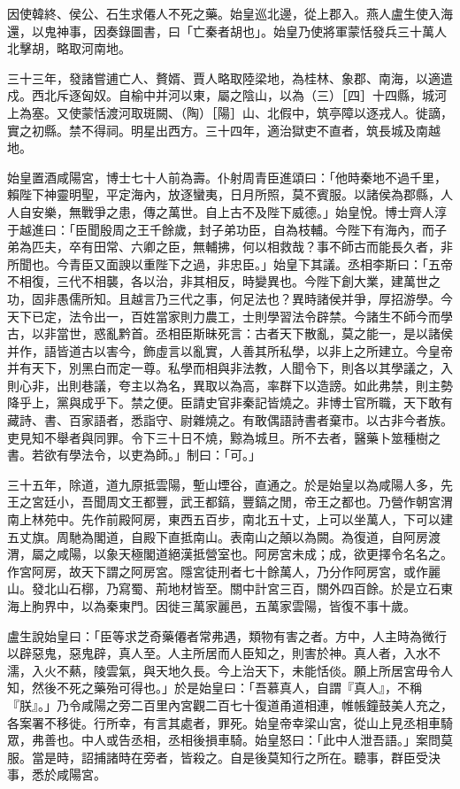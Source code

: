 \begin{pinyinscope}
因使韓終、侯公、石生求僊人不死之藥。始皇巡北邊，從上郡入。燕人盧生使入海還，以鬼神事，因奏錄圖書，曰「亡秦者胡也」。始皇乃使將軍蒙恬發兵三十萬人北擊胡，略取河南地。

三十三年，發諸嘗逋亡人、贅婿、賈人略取陸梁地，為桂林、象郡、南海，以適遣戍。西北斥逐匈奴。自榆中并河以東，屬之陰山，以為（三）［四］十四縣，城河上為塞。又使蒙恬渡河取斑闕、（陶）［陽］山、北假中，筑亭障以逐戎人。徙謫，實之初縣。禁不得祠。明星出西方。三十四年，適治獄吏不直者，筑長城及南越地。

始皇置酒咸陽宮，博士七十人前為壽。仆射周青臣進頌曰：「他時秦地不過千里，賴陛下神靈明聖，平定海內，放逐蠻夷，日月所照，莫不賓服。以諸侯為郡縣，人人自安樂，無戰爭之患，傳之萬世。自上古不及陛下威德。」始皇悅。博士齊人淳于越進曰：「臣聞殷周之王千餘歲，封子弟功臣，自為枝輔。今陛下有海內，而子弟為匹夫，卒有田常、六卿之臣，無輔拂，何以相救哉？事不師古而能長久者，非所聞也。今青臣又面諛以重陛下之過，非忠臣。」始皇下其議。丞相李斯曰：「五帝不相復，三代不相襲，各以治，非其相反，時變異也。今陛下創大業，建萬世之功，固非愚儒所知。且越言乃三代之事，何足法也？異時諸侯并爭，厚招游學。今天下已定，法令出一，百姓當家則力農工，士則學習法令辟禁。今諸生不師今而學古，以非當世，惑亂黔首。丞相臣斯昧死言：古者天下散亂，莫之能一，是以諸侯并作，語皆道古以害今，飾虛言以亂實，人善其所私學，以非上之所建立。今皇帝并有天下，別黑白而定一尊。私學而相與非法教，人聞令下，則各以其學議之，入則心非，出則巷議，夸主以為名，異取以為高，率群下以造謗。如此弗禁，則主勢降乎上，黨與成乎下。禁之便。臣請史官非秦記皆燒之。非博士官所職，天下敢有藏詩、書、百家語者，悉詣守、尉雜燒之。有敢偶語詩書者棄市。以古非今者族。吏見知不舉者與同罪。令下三十日不燒，黥為城旦。所不去者，醫藥卜筮種樹之書。若欲有學法令，以吏為師。」制曰：「可。」

三十五年，除道，道九原抵雲陽，塹山堙谷，直通之。於是始皇以為咸陽人多，先王之宮廷小，吾聞周文王都豐，武王都鎬，豐鎬之閒，帝王之都也。乃營作朝宮渭南上林苑中。先作前殿阿房，東西五百步，南北五十丈，上可以坐萬人，下可以建五丈旗。周馳為閣道，自殿下直抵南山。表南山之顛以為闕。為復道，自阿房渡渭，屬之咸陽，以象天極閣道絕漢抵營室也。阿房宮未成；成，欲更擇令名名之。作宮阿房，故天下謂之阿房宮。隱宮徒刑者七十餘萬人，乃分作阿房宮，或作麗山。發北山石槨，乃寫蜀、荊地材皆至。關中計宮三百，關外四百餘。於是立石東海上朐界中，以為秦東門。因徙三萬家麗邑，五萬家雲陽，皆復不事十歲。

盧生說始皇曰：「臣等求芝奇藥僊者常弗遇，類物有害之者。方中，人主時為微行以辟惡鬼，惡鬼辟，真人至。人主所居而人臣知之，則害於神。真人者，入水不濡，入火不爇，陵雲氣，與天地久長。今上治天下，未能恬倓。願上所居宮毋令人知，然後不死之藥殆可得也。」於是始皇曰：「吾慕真人，自謂『真人』，不稱『朕』。」乃令咸陽之旁二百里內宮觀二百七十復道甬道相連，帷帳鐘鼓美人充之，各案署不移徙。行所幸，有言其處者，罪死。始皇帝幸梁山宮，從山上見丞相車騎眾，弗善也。中人或告丞相，丞相後損車騎。始皇怒曰：「此中人泄吾語。」案問莫服。當是時，詔捕諸時在旁者，皆殺之。自是後莫知行之所在。聽事，群臣受決事，悉於咸陽宮。


\end{pinyinscope}
